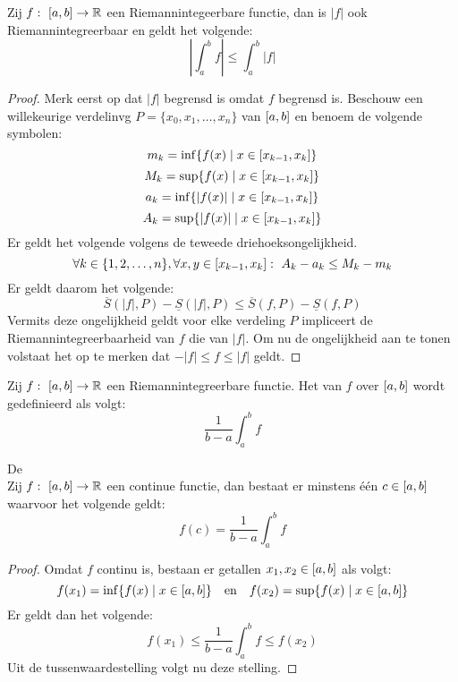 \documentclass[main.tex]{subfiles}
\begin{document}
\begin{bpr}
  \label{pr:absolute-waarde-bijna-door-integraal}
  Zij $f:\ \interval{a}{b} \rightarrow \mathbb{R}$ een Riemannintegeerbare functie, dan is $|f|$ ook Riemannintegreerbaar en geldt het volgende:
  \[ \left| \int_{a}^{b}f \right| \le \int_{a}^{b}|f| \]

  \begin{proof}
    Merk eerst op dat $|f|$ begrensd is omdat $f$ begrensd is.
    Beschouw een willekeurige verdelinvg $P = \{x_{0},x_{1},\dotsc,x_{n}\}$ van $\interval{a}{b}$ en benoem de volgende symbolen:
    \[ m_{k} = \inf\{ f(x) \mid x\in \interval{x_{k-1}}{x_{k}} \} \]
    \[ M_{k} = \sup\{ f(x) \mid x\in \interval{x_{k-1}}{x_{k}} \} \]
    \[ a_{k} = \inf\{ |f(x)| \mid x\in \interval{x_{k-1}}{x_{k}} \} \]
    \[ A_{k} = \sup\{ |f(x)| \mid x\in \interval{x_{k-1}}{x_{k}} \} \]
    Er geldt het volgende volgens de teweede driehoeksongelijkheid.
    \[ \forall k\in\{1,2,\dotsc,n\}, \forall x,y\in\interval{x_{k-1}}{x_{k}}:\ A_{k}-a_{k} \le M_{k}-m_{k} \]
    Er geldt daarom het volgende:
    \[ \overline{S}(|f|,P) - \underline{S}(|f|,P) \le \overline{S}(f,P) - \underline{S}(f,P) \]
    Vermits deze ongelijkheid geldt voor elke verdeling $P$ impliceert de Riemannintegreerbaarheid van $f$ die van $|f|$.
    Om nu de ongelijkheid aan te tonen volstaat het op te merken dat $-|f| \le f \le |f|$ geldt.
  \end{proof}
\end{bpr}

\begin{de}
  Zij $f:\ \interval{a}{b} \rightarrow \mathbb{R}$ een Riemannintegreerbare functie.
  Het  van $f$ over $\interval{a}{b}$ wordt gedefinieerd als volgt:
  \[ \frac{1}{b-a} \int_{a}^{b}f \]
\end{de}

\begin{bst}
  De \\
  Zij $f:\ \interval{a}{b} \rightarrow \mathbb{R}$ een continue functie, dan bestaat er minstens \'e\'en $c\in \interval{a}{b}$ waarvoor het volgende geldt:
  \[ f(c) = \frac{1}{b-a} \int_{a}^{b}f \]

  \begin{proof}
    Omdat $f$ continu is, bestaan er getallen $x_{1},x_{2}\in\interval{a}{b}$ als volgt:
    \[ f(x_{1}) = \inf\{f(x) \mid x\in\interval{a}{b}\} \quad\text{en}\quad f(x_{2}) = \sup\{f(x) \mid x\in\interval{a}{b}\} \]
    Er geldt dan het volgende:
    \[ f(x_{1}) \le \frac{1}{b-a} \int_{a}^{b}f \le f(x_{2}) \]
    Uit de tussenwaardestelling volgt nu deze stelling.\waarom
  \end{proof}
\end{bst}
\end{document}
